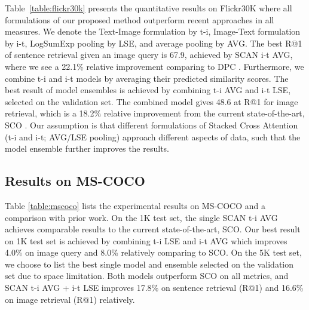 \documentclass[runningheads]{llncs}
\begin{document}
Table~\ref{table:flickr30k} presents the quantitative results on Flickr30K where all formulations of our proposed method outperform recent approaches in all measures. We denote the Text-Image formulation by t-i, Image-Text formulation by i-t, LogSumExp pooling by LSE, and average pooling by AVG. The best R@1 of sentence retrieval given an image query is 67.9, achieved by SCAN i-t AVG, where we see a 22.1\% relative improvement comparing to DPC \cite{zheng2017dual}. Furthermore, we combine t-i and i-t models by averaging their predicted similarity scores. 
The best result of model ensembles is achieved by combining t-i AVG and i-t LSE, selected on the validation set. The combined model gives 48.6 at R@1 for image retrieval, which is a 18.2\% relative improvement from the current state-of-the-art, SCO \cite{huang2017learning}. Our assumption is that different formulations of Stacked Cross Attention (t-i and i-t; AVG/LSE pooling) approach different aspects of data, such that the model ensemble further improves the results.

\subsection{Results on MS-COCO}
\label{sec:res_coco}

Table \ref{table:mscoco} lists the experimental results on MS-COCO and a comparison with prior work. On the 1K test set, the single SCAN t-i AVG achieves comparable results to the current state-of-the-art, SCO. Our best result on 1K test set is achieved by combining t-i LSE and i-t AVG which improves 4.0\% on image query and 8.0\% relatively comparing to SCO. On the 5K test set, we choose to list the best single model and ensemble selected on the validation set due to space limitation. Both models outperform SCO on all metrics, and SCAN t-i AVG + i-t LSE improves 17.8\% on sentence retrieval (R@1) and 16.6\% on image retrieval (R@1) relatively.
\end{document}

